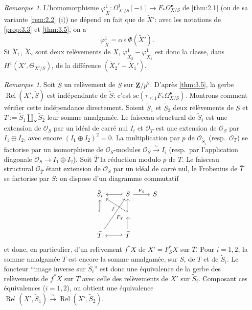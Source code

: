 \documentclass[12pt,a4paper]{article}
\theoremstyle{plain}
\theoremstyle{definition}
\theoremstyle{remark}
\newtheorem{remark}[theorem]{Remarque}
\DeclareMathOperator{\Rel}{Rel}
\newcommand{\cO}{\mathcal{O}}
\begin{document}
\begin{remark}\label{rem:3.8}
L'homomorphisme $\varphi^1_{\tilde{X}}: \Omega^1_{X'/S}[-1] \to F_* \Omega^{\bullet}_{X/S}$ de \ref{thm:2.1} (ou de sa variante \ref{rem:2.2} (i)) ne d\'epend en fait que de $\tilde{X}'$: avec les notations de \ref{prop:3.3} et \ref{thm:3.5}, on a
\[
\varphi^1_{\tilde{X}} = \alpha \circ \Phi(\tilde{X}').
\]
Si $\tilde{X}_1$, $\tilde{X}_2$ sont deux rel\`evements de $X$, $\varphi^1_{\tilde{X}_2} - \varphi^1_{\tilde{X}_1}$ est donc la classe, dans $H^1(X', \Theta_{X'/S})$, de la diff\'erence $(\tilde{X}_2' - \tilde{X}_1')$.
\end{remark}

\begin{remark}\label{rem:3.9}
Soit $\tilde{S}$ un rel\`evement de $S$ sur $\mathbf{Z}/p^2$. D'apr\`es \ref{thm:3.5}, la gerbe $\Rel(X', \tilde{S})$ est ind\'ependante de $\tilde{S}$: c'est $\mathrm{sc}(\tau_{\le 1} F_* \Omega^{\bullet}_{X/S})$. Montrons comment v\'erifier cette ind\'ependance directement. Soient $\tilde{S}_1$ et $\tilde{S}_2$ deux rel\`evements de $S$ et $T := \tilde{S}_1 \amalg_S \tilde{S}_2$ leur somme amalgam\'ee. Le faisceau structural de $\tilde{S}_i$ est une extension de $\cO_S$ par un id\'eal de carr\'e nul $I_i$ et $\cO_T$ est une extension de $\cO_S$ par $I_1 \oplus I_2$, avec encore $(I_1 \oplus I_2)^2 = 0$. La multiplication par $p$ de $\cO_{\tilde{S}_i}$ (resp.~$\cO_T$) se factorise par un isomorphisme de $\cO_S$-modules $\cO_S \xrightarrow{\sim} I_i$ (resp.~par l'application diagonale $\cO_S \to I_1 \oplus I_2$). Soit $\bar{T}$ la r\'eduction modulo $p$ de $T$. Le faisceau structural $\cO_{\bar{T}}$ \'etant extension de $\cO_S$ par un id\'eal de carr\'e nul, le Frobenius de $\bar{T}$ se factorise par $S$: on dispose d'un diagramme commutatif
\[
\begin{tikzcd}
\tilde{S}_i \arrow[r, hookleftarrow] & S \arrow[r, "F_S"] & S \\
\arrow[u, hook] & \arrow[u, hook] \arrow[ul, "f"] \\
\bar{T} \arrow[r, hookleftarrow] \arrow[uur, "F_{\bar{T}}"'] & \bar{T} \arrow[u]
\end{tikzcd}
\]
et donc, en particulier, d'un rel\`evement $f^* X$ de $X' = F_S^* X$ sur $\bar{T}$. Pour $i = 1, 2$, la somme amalgam\'ee $T$ est encore la somme amalgam\'ee, sur $S$, de $\bar{T}$ et de $\tilde{S}_i$. Le foncteur ``image inverse sur $\tilde{S}_i$'' est donc une \'equivalence de la gerbe des rel\`evements de $f^* X$ sur $\bar{T}$ avec celle des rel\`evements de $X'$ sur $\tilde{S}_i$. Composant ces \'equivalences ($i = 1, 2$), on obtient une \'equivalence $\Rel(X', \tilde{S}_1) \xrightarrow{\sim} \Rel(X', \tilde{S}_2)$.
\end{remark}
\end{document}
